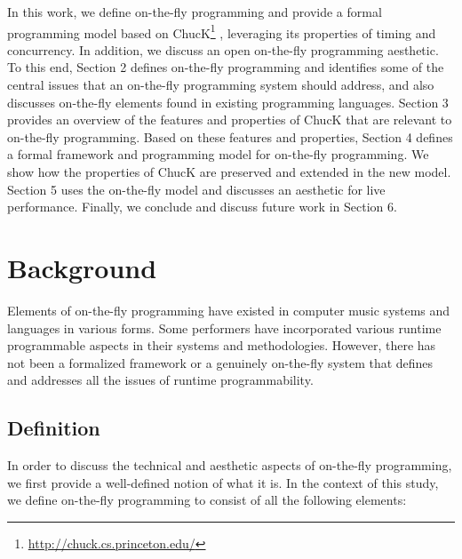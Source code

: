 In this work, we define on-the-fly programming and provide a formal programming model based on ChucK\footnote{\url{http://chuck.cs.princeton.edu/}} \cite{Wang:2015}, leveraging its properties of timing and concurrency. In addition, we discuss an open on-the-fly programming aesthetic.  To this end, Section 2 defines on-the-fly programming and identifies some of the central issues that an on-the-fly programming system should address, and also discusses on-the-fly elements found in existing programming languages. Section 3 provides an overview of the features and properties of ChucK that are relevant to on-the-fly programming.  Based on these features and properties, Section 4 defines a formal framework and programming model for on-the-fly programming.  We show how the properties of ChucK are preserved and extended in the new model. Section 5 uses the on-the-fly model and discusses an aesthetic for live performance.  Finally, we conclude and discuss future work in Section 6.


\section{Background}

Elements of on-the-fly programming have existed in computer music systems and languages in various forms.  Some performers have incorporated various runtime programmable aspects in their systems and methodologies.  However, there has not been a formalized framework or a genuinely on-the-fly system that defines and addresses all the issues of runtime programmability.

\subsection{Definition}

In order to discuss the technical and aesthetic aspects of on-the-fly programming, we first provide a well-defined notion of what it is.  In the context of this study, we define on-the-fly programming to consist of all the following elements:

